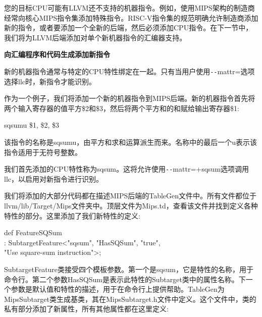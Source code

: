 您的目标CPU可能有LLVM还不支持的机器指令。例如，使用MIPS架构的制造商经常向核心MIPS指令集添加特殊指令。RISC-V指令集的规范明确允许制造商添加新的指令，或者要添加一个全新的后端，然后必须添加CPU指令。在下一节中，我们将为LLVM后端添加对单个新机器指令的汇编器支持。\par

\hspace*{\fill} \par %
\textbf{向汇编程序和代码生成添加新指令}

新的机器指令通常与特定的CPU特性绑定在一起。只有当用户使用\verb|--|mattr=选项选择llc时，新指令才能识别。\par

作为一个例子，我们将添加一个新的机器指令到MIPS后端。新的机器指令首先将两个输入寄存器的值平方\$2和\$3，然后将两个平方和的和赋给输出寄存器\$1:\par

\begin{tcolorbox}[colback=white,colframe=black]
sqsumu \$1, \$2, \$3
\end{tcolorbox}

该指令的名称是sqsumu，由平方和求和运算派生而来。名称中的最后一个u表示该指令适用于无符号整数。\par

我们首先添加的CPU特性称为sqsum。这将允许使用\verb|--|mattr=+sqsum选项调用llc，以启用对新指令进行识别。\par

我们将添加的大部分代码都在描述MIPS后端的TableGen文件中。所有文件都位于llvm/lib/Target/Mips文件夹中。顶层文件为Mips.td，查看该文件并找到定义各种特性的部分。这里添加了我们新特性的定义:\par

\begin{tcolorbox}[colback=white,colframe=black]
def FeatureSQSum \\
\hspace*{1cm}: SubtargetFeature<"sqsum", "HasSQSum", "true", \\
\hspace*{6cm}"Use square-sum instruction">;
\end{tcolorbox}

SubtargetFeature类接受四个模板参数。第一个是sqsum，它是特性的名称，用于命令行。第二个参数HasSQSum是表示此特性的Subtarget类中的属性名称。下一个参数是默认值和特性的描述，用于在命令行上提供帮助。TableGen为MipsSubtarget类生成基类，其在MipsSubtarget.h文件中定义。这个文件中，类的私有部分添加了新属性，所有其他属性都在这里定义:\par

